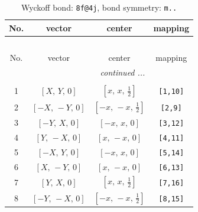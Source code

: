 \documentclass[fleqn,8pt]{jsarticle}
\begin{document}
\begin{longtable}{cccc}
\caption{Wyckoff bond: {\tt 8f@4j}, bond symmetry: {\tt m..}}
 \\
 \hline \hline
No. & vector & center & mapping \\ \hline \endfirsthead

\multicolumn{3}{l}{\tablename\ \thetable{}} \\
 \hline \hline
No. & vector & center & mapping \\ \hline \endhead

 \hline \hline
\multicolumn{3}{r}{\footnotesize\it continued ...} \\ \endfoot

 \hline \hline
\multicolumn{3}{r}{} \\ \endlastfoot

1 & $\left[ X,\, Y,\, 0 \right]$ & $\left[ x,\, x,\, \frac{1}{2} \right]$ & {\tt [1,10]} \\ \hline
2 & $\left[ - X,\, - Y,\, 0 \right]$ & $\left[ - x,\, - x,\, \frac{1}{2} \right]$ & {\tt [2,9]} \\ \hline
3 & $\left[ - Y,\, X,\, 0 \right]$ & $\left[ - x,\, x,\, 0 \right]$ & {\tt [3,12]} \\ \hline
4 & $\left[ Y,\, - X,\, 0 \right]$ & $\left[ x,\, - x,\, 0 \right]$ & {\tt [4,11]} \\ \hline
5 & $\left[ - X,\, Y,\, 0 \right]$ & $\left[ - x,\, x,\, 0 \right]$ & {\tt [5,14]} \\ \hline
6 & $\left[ X,\, - Y,\, 0 \right]$ & $\left[ x,\, - x,\, 0 \right]$ & {\tt [6,13]} \\ \hline
7 & $\left[ Y,\, X,\, 0 \right]$ & $\left[ x,\, x,\, \frac{1}{2} \right]$ & {\tt [7,16]} \\ \hline
8 & $\left[ - Y,\, - X,\, 0 \right]$ & $\left[ - x,\, - x,\, \frac{1}{2} \right]$ & {\tt [8,15]} \\
\end{longtable}
\renewcommand{\arraystretch}{1.2}
\end{document}
